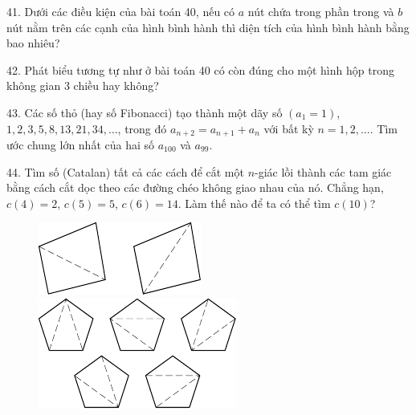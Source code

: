 \begin{problem}{41.}
	Dưới các điều kiện của bài toán 40, nếu có $a$ nút chứa trong phần trong và $b$ nút nằm trên các cạnh của hình bình hành thì diện tích của hình bình hành bằng bao nhiêu?
\end{problem}

\begin{problem}{42.}
	Phát biểu tương tự như ở bài toán 40 có còn đúng cho một hình hộp trong không gian 3 chiều hay không?
\end{problem}


\begin{problem}{43.}
	Các số thỏ (hay số Fibonacci) tạo thành một dãy số $(a_1=1)$, $1,2,3,5,8,13,21,34,\dotsc$, trong đó $a_{n+2}=a_{n+1}+a_n$ với bất kỳ $n=1,2,\dotsc$. Tìm ước chung lớn nhất của hai số $a_{100}$ và $a_{99}$.
\end{problem}

\begin{problem}{44.}
	Tìm số (Catalan) tất cả các cách để cắt một $n$-giác lồi thành các tam giác bằng cách cắt dọc theo các đường chéo không giao nhau của nó. Chẳng hạn, $c(4)=2$, $c(5)=5$, $c(6)=14$. Làm thế nào để ta có thể tìm $c(10)$?
	\begin{figure}
		\includegraphics{resources/taskbook-281}
		\qquad
		\includegraphics{resources/taskbook-282}
	\end{figure}
\end{problem}

